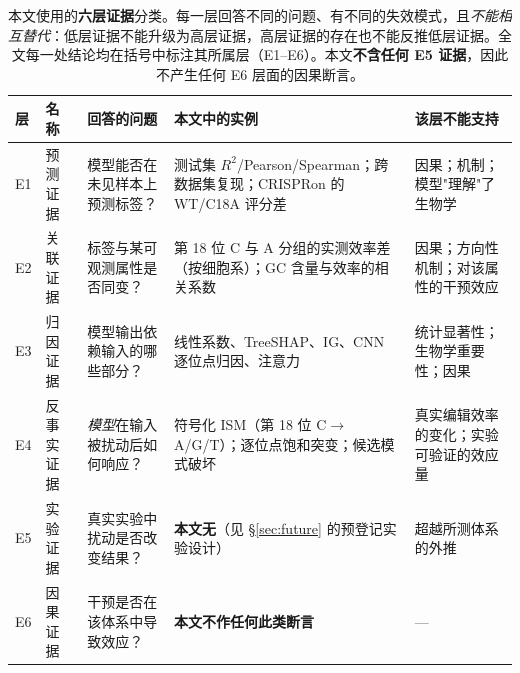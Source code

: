 \begin{table}[htbp]
\centering
\footnotesize
\caption{本文使用的\textbf{六层证据}分类。每一层回答不同的问题、有不同的失效模式，且\emph{不能相互替代}：低层证据不能升级为高层证据，高层证据的存在也不能反推低层证据。全文每一处结论均在括号中标注其所属层（E1--E6）。本文\textbf{不含任何 E5 证据}，因此不产生任何 E6 层面的因果断言。}
\label{tab:evidence-layers}
\begin{tabular}{p{0.5cm}p{2.6cm}p{3.4cm}p{4.2cm}p{3.6cm}}
\toprule
层 & 名称 & 回答的问题 & 本文中的实例 & 该层\textbf{不能}支持 \\
\midrule
E1 & 预测证据 & 模型能否在未见样本上预测标签？ & 测试集 $R^{2}$/Pearson/Spearman；跨数据集复现；CRISPRon 的 WT/C18A 评分差 & 因果；机制；模型"理解"了生物学 \\
\midrule
E2 & 关联证据 & 标签与某可观测属性是否同变？ & 第 18 位 C 与 A 分组的实测效率差（按细胞系）；GC 含量与效率的相关系数 & 因果；方向性机制；对该属性的干预效应 \\
\midrule
E3 & 归因证据 & 模型输出依赖输入的哪些部分？ & 线性系数、TreeSHAP、IG、CNN 逐位点归因、注意力 & 统计显著性；生物学重要性；因果 \\
\midrule
E4 & 反事实证据 & \emph{模型}在输入被扰动后如何响应？ & 符号化 ISM（第 18 位 C$\rightarrow$A/G/T）；逐位点饱和突变；候选模式破坏 & 真实编辑效率的变化；实验可验证的效应量 \\
\midrule
E5 & 实验证据 & 真实实验中扰动是否改变结果？ & \textbf{本文无}（见 \S\ref{sec:future} 的预登记实验设计） & 超越所测体系的外推 \\
\midrule
E6 & 因果证据 & 干预是否在该体系中导致效应？ & \textbf{本文不作任何此类断言} & --- \\
\bottomrule
\end{tabular}
\end{table}
